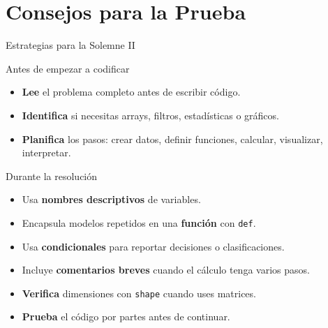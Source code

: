 \documentclass[10pt]{beamer}
\begin{document}
\section{Consejos para la Prueba}

\begin{frame}[shrink=6]{Estrategias para la Solemne II}
  \begin{alertblock}{Antes de empezar a codificar}
    \begin{itemize}
      \item \textbf{Lee} el problema completo antes de escribir código.
      \item \textbf{Identifica} si necesitas arrays, filtros, estadísticas o gráficos.
      \item \textbf{Planifica} los pasos: crear datos, definir funciones, calcular, visualizar, interpretar.
    \end{itemize}
  \end{alertblock}

  \begin{block}{Durante la resolución}
    \begin{itemize}
      \item Usa \textbf{nombres descriptivos} de variables.
      \item Encapsula modelos repetidos en una \textbf{función} con \texttt{def}.
      \item Usa \textbf{condicionales} para reportar decisiones o clasificaciones.
      \item Incluye \textbf{comentarios breves} cuando el cálculo tenga varios pasos.
      \item \textbf{Verifica} dimensiones con \texttt{shape} cuando uses matrices.
      \item \textbf{Prueba} el código por partes antes de continuar.
    \end{itemize}
  \end{block}
\end{frame}
\end{document}

